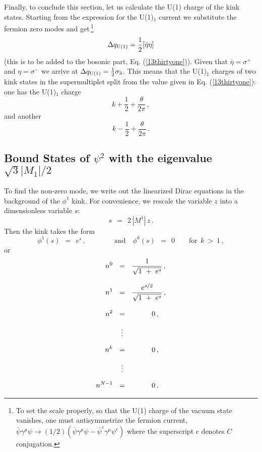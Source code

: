 \documentclass[epsfig,12pt]{article}
\def\beq{\begin{equation}}
\def\eeq{\end{equation}}
\def\beq{\begin{equation}}
\def\eeq{\end{equation}}
\begin{document}
Finally, to conclude this section, let us calculate the U(1) charge
of the kink states. Starting from the expression  for the U(1)$_1$ current we
substitute the fermion zero modes and get\,\footnote{To set the scale properly, so that
the U(1) charge of the vacuum state vanishes, one must
antisymmetrize
the fermion current, $\bar\psi\gamma^\mu\psi \to
(1/2)\left(\bar\psi\gamma^\mu\psi - \bar\psi^c\gamma^\mu\psi^c
\right)
$ where the superscript c denotes $C$ conjugation.}
\beq
\Delta q_{\rm U(1)} = \frac{1}{2} [\bar\eta\eta ]
\label{13fiftytwo}
\eeq
(this is to be added to the bosonic part, Eq. (\ref{13thirtyone})).
Given that $\bar \eta = \sigma^+$ and $ \eta = \sigma^-$ we arrive at
$\Delta q_{\rm U(1)} = \frac{1}{2} \sigma_3$. This means that the U(1)$_1$ charges
of two kink states in the supermultiplet
split from the value given in Eq. (\ref{13thirtyone}):
one has the U(1)$_1$ charge
$$
k+\frac{1}{2} +\frac{\theta}{2\pi}\,,
$$
and another
$$
k-\frac{1}{2} +\frac{\theta}{2\pi}\,.
$$









\subsection{Bound States of $\psi^2$ with the eigenvalue $\sqrt{3}|M_1|/2$}
\label{bound}



       To find the non-zero mode, we write out the linearized Dirac equations in the background
       of the $ \phi^1 $ kink.
       For convenience, we rescale the variable $ z $ into a dimensionless variable $ s $:
\beq
       s ~~=~~ 2\, |M^1|\, z\,.
\eeq
       Then the kink takes the form
\beq
       \phi^1(s) ~~=~~ e^s\,,\qquad\qquad\text{and}\quad \phi^k(s) ~~=~~ 0 \qquad \text{for}~~ k ~>~ 1\,,
\eeq
       or
\begin{align}
%
\notag
       n^0  & ~~=~~ \frac {             1              }
                          {    \sqrt{ 1 ~+~ e^s }      }\,, \\[3mm]
%
\notag
       n^1  & ~~=~~ \frac {          e^{s/2}           }
                          {    \sqrt{ 1 ~+~ e^s }      }\,, \\[3mm]
%
\notag
       n^2  & ~~=~~ \qquad~~\, 0\,,  \\[2mm]
%	 
            & ~~~\,\vdots          \\[2mm]
%
\notag
       n^k  & ~~=~~ \qquad~~\, 0\,,  \\[2mm]
%	 
\notag
            & ~~~\,\vdots          \\[2mm]
%
\notag
       n^{N-1} & ~~=~~ \qquad~~\, 0\,.                
\end{align}
\end{document}
